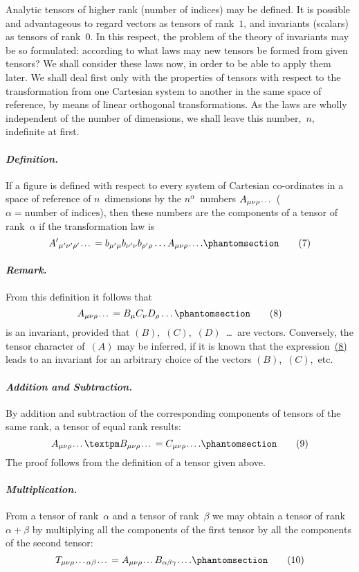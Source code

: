 \documentclass[12pt]{book}[2005/09/16]
\newcommand{\Paragraph}[1]{\paragraph*{\indent\normalfont\itshape#1}}
\newcommand{\Change}[2]{#2}
\newcommand{\Add}[1]{\Change{}{#1}}
\newcommand{\PageSep}[1]{\ignorespaces}
\newcommand{\Tag}[1]{%
  \phantomsection
  \label{eqn:#1}
  \tag*{#1}
}
\newcommand{\Eqref}[1]{\hyperref[eqn:#1]{#1}}
\newcommand{\Subdots}{\,\mbox{\footnotesize$\cdots$}}
\begin{document}
Analytic tensors of higher rank (number of indices)
may be defined. It is possible and advantageous to
regard vectors as tensors of rank~$1$, and invariants (scalars)
as tensors of rank~$0$. In this respect, the problem of the
theory of invariants may be so formulated: according to
what laws may new tensors be formed from given tensors?
\PageSep{14}
%
%
We shall consider these laws now, in order to be able to
apply them later. We shall deal first only with the
properties of tensors with respect to the transformation
from one Cartesian system to another in the same space
of reference, by means of linear orthogonal transformations.
As the laws are wholly independent of the number
of dimensions, we shall leave this number,~$n$, indefinite at
first.

\Paragraph{Definition.} If a figure is defined with respect to every
system of Cartesian co-ordinates in a space of reference of
$n$~dimensions by the $n^{\alpha}$~numbers $A_{\mu\nu\rho\Subdots}$ ($\alpha = \text{number
of indices}$), then these numbers are the components of a
tensor of rank~$\alpha$ if the transformation law is
%
%
\[
{A'}_{\mu'\nu'\rho'\Subdots}
  = b_{\mu'\mu} b_{\nu'\nu} b_{\rho'\rho} \dots A_{\mu\nu\rho\Subdots}\Add{.}
\Tag{(7)}
\]

\Paragraph{Remark.} From this definition it follows that
\[
A_{\mu\nu\rho\Subdots} = B_{\mu} C_{\nu} D_{\rho}\dots
\Tag{(8)}
\]
is an invariant, provided that $(B)$,~$(C)$,~$(D)$~\dots\ are
vectors. Conversely, the tensor character of~$(A)$ may be
inferred, if it is known that the expression~\Eqref{(8)} leads to an
invariant for an arbitrary choice of the vectors $(B)$,~$(C)$,~etc.

\Paragraph{Addition and Subtraction.} By addition and subtraction
%
%
of the corresponding components of tensors of the same
rank, a tensor of equal rank results:
\[
A_{\mu\nu\rho\Subdots} ± B_{\mu\nu\rho\Subdots} = C_{\mu\nu\rho\Subdots}.
\Tag{(9)}
\]
The proof follows from the definition of a tensor given
above.

\Paragraph{Multiplication.} From a tensor of rank~$\alpha$ and a tensor
%
%
\PageSep{15}
of rank~$\beta$ we may obtain a tensor of rank~$\alpha + \beta$ by
multiplying all the components of the first tensor by all
the components of the second tensor:
\[
T_{\mu\nu\rho\Subdots\alpha\beta\Subdots}
= A_{\mu\nu\rho\Subdots} B_{\alpha\beta\gamma\Subdots}\Add{.}
\Tag{(10)}
\]
\end{document}
